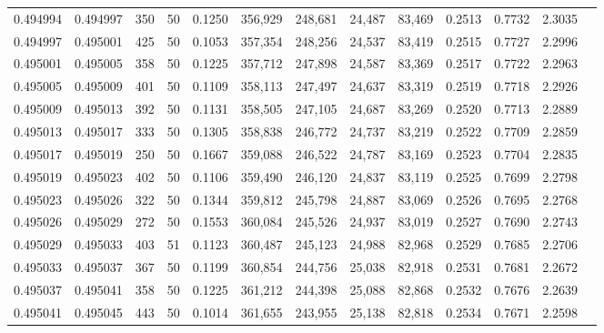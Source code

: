 \begin{tabular}{rrrrrrrrrrrrr}
0.494994 & 0.494997 &   350 &  50 &                                     0.1250 & 356,929 & 248,681 &  24,487 &  83,469 & 0.2513 & 0.7732 & 2.3035 \\
0.494997 & 0.495001 &   425 &  50 &                                     0.1053 & 357,354 & 248,256 &  24,537 &  83,419 & 0.2515 & 0.7727 & 2.2996 \\
0.495001 & 0.495005 &   358 &  50 &                                     0.1225 & 357,712 & 247,898 &  24,587 &  83,369 & 0.2517 & 0.7722 & 2.2963 \\
0.495005 & 0.495009 &   401 &  50 &                                     0.1109 & 358,113 & 247,497 &  24,637 &  83,319 & 0.2519 & 0.7718 & 2.2926 \\
0.495009 & 0.495013 &   392 &  50 &                                     0.1131 & 358,505 & 247,105 &  24,687 &  83,269 & 0.2520 & 0.7713 & 2.2889 \\
0.495013 & 0.495017 &   333 &  50 &                                     0.1305 & 358,838 & 246,772 &  24,737 &  83,219 & 0.2522 & 0.7709 & 2.2859 \\
0.495017 & 0.495019 &   250 &  50 &                                     0.1667 & 359,088 & 246,522 &  24,787 &  83,169 & 0.2523 & 0.7704 & 2.2835 \\
0.495019 & 0.495023 &   402 &  50 &                                     0.1106 & 359,490 & 246,120 &  24,837 &  83,119 & 0.2525 & 0.7699 & 2.2798 \\
0.495023 & 0.495026 &   322 &  50 &                                     0.1344 & 359,812 & 245,798 &  24,887 &  83,069 & 0.2526 & 0.7695 & 2.2768 \\
0.495026 & 0.495029 &   272 &  50 &                                     0.1553 & 360,084 & 245,526 &  24,937 &  83,019 & 0.2527 & 0.7690 & 2.2743 \\
0.495029 & 0.495033 &   403 &  51 &                                     0.1123 & 360,487 & 245,123 &  24,988 &  82,968 & 0.2529 & 0.7685 & 2.2706 \\
0.495033 & 0.495037 &   367 &  50 &                                     0.1199 & 360,854 & 244,756 &  25,038 &  82,918 & 0.2531 & 0.7681 & 2.2672 \\
0.495037 & 0.495041 &   358 &  50 &                                     0.1225 & 361,212 & 244,398 &  25,088 &  82,868 & 0.2532 & 0.7676 & 2.2639 \\
0.495041 & 0.495045 &   443 &  50 &                                     0.1014 & 361,655 & 243,955 &  25,138 &  82,818 & 0.2534 & 0.7671 & 2.2598 \\

\end{tabular}
